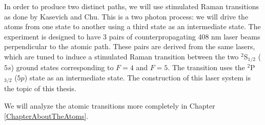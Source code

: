 In order to produce two distinct paths, we will use stimulated Raman transitions as done by Kasevich and Chu\cite{kasevichChu1991}. This is a two photon process: we will drive the atoms from one state to another using a third state as an intermediate state. The experiment is designed to have 3 pairs of counterpropagating 408 nm laser beams perpendicular to the atomic path. These pairs are derived from the same lasers, which are tuned to induce a stimulated Raman transition between the two $^2$S$_{1/2}$ ($5s$) ground states corresponding to $F=4$ and $F=5$. The transition uses the $^2$P$_{3/2}$ ($5p$) state as an intermediate state. The construction of this laser system is the topic of this thesis.


We will analyze the atomic transitions more completely in Chapter \ref{ChapterAboutTheAtoms}.




